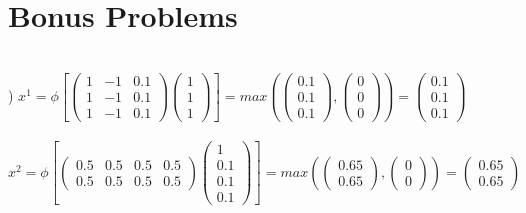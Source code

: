 \documentclass[12pt]{article}
\begin{document}
\noindent \hrulefill \\\pagebreak



\section{Bonus Problems}
\ \\


) $x^1 = \phi\left[
\begin{pmatrix}
1 & -1 & 0.1\\
1 & -1 & 0.1\\
1 & -1 & 0.1
\end{pmatrix}
\begin{pmatrix}
1\\ 1\\ 1
\end{pmatrix}\right]= max\left(
\begin{pmatrix}
0.1\\ 0.1\\ 0.1
\end{pmatrix}, 
\begin{pmatrix}
0\\ 0\\ 0
\end{pmatrix}\right) = 
\begin{pmatrix}
0.1\\ 0.1\\ 0.1
\end{pmatrix}$\\\\

\indent $x^2 = \phi\left[
\begin{pmatrix}
0.5 & 0.5 & 0.5 & 0.5\\
0.5 & 0.5 & 0.5 & 0.5
\end{pmatrix}
\begin{pmatrix}
1\\ 0.1\\ 0.1\\ 0.1
\end{pmatrix}\right]= max\left(
\begin{pmatrix}
0.65\\ 0.65
\end{pmatrix}, 
\begin{pmatrix}
0\\ 0
\end{pmatrix}\right) = 
\begin{pmatrix}
0.65\\ 0.65
\end{pmatrix}$\\\\
\end{document}
